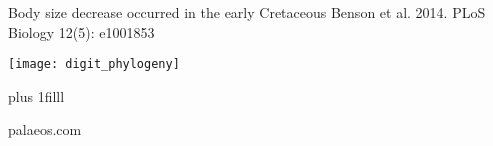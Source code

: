 \documentclass[t]{beamer}
\begin{document}
{
\begin{frame}[b,plain]{Body size decrease occurred in the early Cretaceous}
	\tiny Benson et al. 2014. PLoS Biology 12(5): e1001853
\end{frame}
}
%
%

%
%	
%
%	
%	
%	

{
\begin{frame}[t,plain]
	\begin{center}
		\texttt{[image: digit\_phylogeny]}
	\end{center}
	
	\vskip0pt plus 1filll
	
	\tiny\hfill palaeos.com
\end{frame}
}

%
\end{document}
